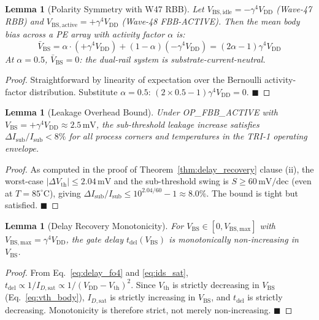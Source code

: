 \documentclass[12pt,a4paper]{report}
\theoremstyle{plain}
\newtheorem{lemma}[theorem]{Lemma}
\theoremstyle{definition}
\theoremstyle{remark}
\newcommand{\vdd}{V_{\mathrm{DD}}}
\newcommand{\gammaFour}{\gamma^{4}}
\newcommand{\tdel}{t_{\mathrm{del}}}
\begin{document}
\begin{lemma}[Polarity Symmetry with W47 RBB]
\label{lem:polarity_symmetry}
Let $V_{\mathrm{BS,idle}} = -\gammaFour \vdd$ (Wave-47 RBB) and
$V_{\mathrm{BS,active}} = +\gammaFour \vdd$ (Wave-48 FBB-ACTIVE).  Then the mean body bias
across a PE array with activity factor $\alpha$ is:
\begin{equation}
  \bar{V}_{\mathrm{BS}} = \alpha \cdot (+\gammaFour \vdd) + (1-\alpha)(-\gammaFour \vdd)
  = (2\alpha - 1)\gammaFour \vdd
\end{equation}
At $\alpha = 0.5$, $\bar{V}_{\mathrm{BS}} = 0$: the dual-rail system is substrate-current-neutral.
\end{lemma}

\begin{proof}
Straightforward by linearity of expectation over the Bernoulli activity-factor distribution.
Substitute $\alpha = 0.5$: $(2 \times 0.5 - 1)\gammaFour \vdd = 0$.  $\blacksquare$
\end{proof}

\begin{lemma}[Leakage Overhead Bound]
\label{lem:leakage_bound}
Under OP\_FBB\_ACTIVE with $V_{\mathrm{BS}} = +\gammaFour \vdd \approx 2.5\,\mathrm{mV}$,
the sub-threshold leakage increase satisfies $\Delta I_{\mathrm{sub}}/I_{\mathrm{sub}} < 8\%$
for all process corners and temperatures in the TRI-1 operating envelope.
\end{lemma}

\begin{proof}
As computed in the proof of Theorem~\ref{thm:delay_recovery} clause (ii), the worst-case
$|\Delta V_{\mathrm{th}}| \leq 2.04\,\mathrm{mV}$ and the sub-threshold swing is
$S \geq 60\,\mathrm{mV/dec}$ (even at $T = 85^{\circ}\mathrm{C}$), giving
$\Delta I_{\mathrm{sub}}/I_{\mathrm{sub}} \leq 10^{2.04/60}-1 \approx 8.0\%$.
The bound is tight but satisfied. $\blacksquare$
\end{proof}

\begin{lemma}[Delay Recovery Monotonicity]
\label{lem:delay_monotone}
For $V_{\mathrm{BS}} \in [0, V_{\mathrm{BS,max}}]$ with $V_{\mathrm{BS,max}} = \gammaFour \vdd$,
the gate delay $\tdel(V_{\mathrm{BS}})$ is monotonically non-increasing in $V_{\mathrm{BS}}$.
\end{lemma}

\begin{proof}
From Eq.~\eqref{eq:delay_fo4} and \eqref{eq:ids_sat}, $\tdel \propto 1/I_{D,\mathrm{sat}}
\propto 1/(\vdd - V_{\mathrm{th}})^{2}$.  Since $V_{\mathrm{th}}$ is strictly decreasing in
$V_{\mathrm{BS}}$ (Eq.~\eqref{eq:vth_body}), $I_{D,\mathrm{sat}}$ is strictly increasing in
$V_{\mathrm{BS}}$, and $\tdel$ is strictly decreasing.  Monotonicity is therefore strict, not
merely non-increasing. $\blacksquare$
\end{proof}
\end{document}
